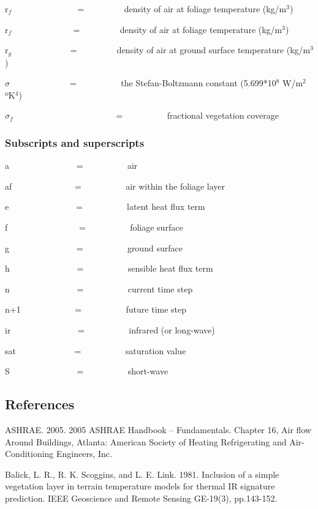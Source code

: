 r\(_{f}\)~ ~~~~~~~~~~~~~ = ~~~~~~~~ density of air at foliage temperature (kg/m\(^{3}\))

r\(_{f}\)~ ~~~~~~~~~~~~ = ~~~~~~~~ density of air at foliage temperature (kg/m\(^{3}\))

r\(_{g}\)~~~~~~~~~~~~~ = ~~~~~~~~ density of air at ground surface temperature (kg/m\(^{3}\))

\(\sigma\) ~ ~~~~~~~~~~~ = ~~~~~~~~~ the Stefan-Boltzmann constant (5.699*10\(^{8}\) W/m\(^{2}\) ºK\(^{4}\))

\({\sigma_f}\) ~~~~~~~~~~~ ~~~~~~~~~~~ = ~~~~~~~~~ fractional vegetation coverage

\subsubsection{Subscripts and superscripts}\label{subscripts-and-superscripts-000}

a~~~~~~~~~~~~~~~ = ~~~~~~~~~ air

af~~~~~~~~~~~~~~ = ~~~~~~~~~ air within the foliage layer

e~~~~~~~~~~~~~~~ = ~~~~~~~~~ latent heat flux term

f~~~~~~~~~~~~~~~~ = ~~~~~~~~~ foliage surface

g~~~~~~~~~~~~~~~ = ~~~~~~~~~ ground surface

h~~~~~~~~~~~~~~~ = ~~~~~~~~~ sensible heat flux term

n~~~~~~~~~~~~~~~ = ~~~~~~~~~ current time step

n+1~~~~~~~~~~~~ = ~~~~~~~~~ future time step

ir~~~~~~~~~~~~~~~ = ~~~~~~~~~ infrared (or long-wave)

sat~~~~~~~~~~~~~ = ~~~~~~~~~ saturation value

S~~~~~~~~~~~~~~~ = ~~~~~~~~~ short-wave

\subsection{References}\label{references-025}

ASHRAE. 2005. 2005 ASHRAE Handbook -- Fundamentals. Chapter 16, Air flow Around Buildings, Atlanta: American Society of Heating Refrigerating and Air-Conditioning Engineers, Inc.

Balick, L. R., R. K. Scoggins, and L. E. Link. 1981. Inclusion of a simple vegetation layer in terrain temperature models for thermal IR signature prediction. IEEE Geoscience and Remote Sensing GE-19(3), pp.143-152.

